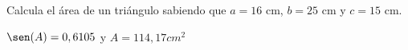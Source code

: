 \documentclass[addpoints,spanish, 12pt,a4paper]{exam}
\begin{document}
\begin{questions}
        
        \question[2] Calcula el área de un triángulo sabiendo que $a=16$ cm, $b=25$ cm y $c=15$ cm.\begin{solution}
        $\sen(A)=0,6105$ y $A=114,17cm^2$
        \end{solution}
        
          
        



\end{questions}
\end{document}
